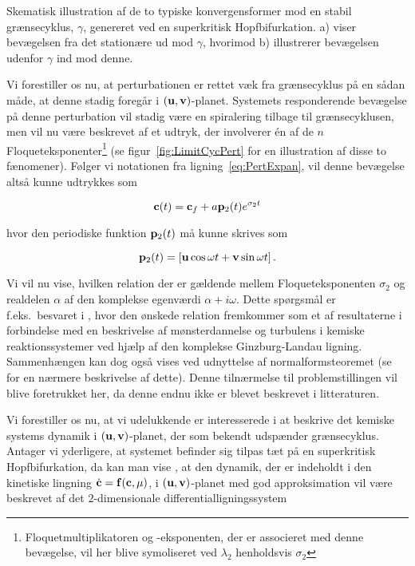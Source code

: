 {
\caption{\protect\capsize 
Skematisk illustration af de to typiske konvergensformer
mod en stabil gr{\ae}nsecyklus, $\gamma$, genereret ved en
superkritisk Hopfbifurkation. a) viser bev{\ae}gelsen fra
det station{\ae}re ud mod $\gamma$, hvorimod b) illustrerer
bev{\ae}gelsen udenfor $\gamma$ ind mod denne.}
\label{fig:LimitCycPert}
}

Vi forestiller os nu, at perturbationen er rettet v{\ae}k
fra gr{\ae}nsecyklus p{\aa} en s{\aa}dan m{\aa}de, at denne
stadig foreg{\aa}r i $({\bf u},{\bf v})$-planet. Systemets
responderende bev{\ae}gelse p{\aa} denne perturbation vil
stadig v{\ae}re en spiralering tilbage til
gr{\ae}nsecyklusen, men vil nu v{\ae}re beskrevet af et
udtryk, der involverer \'{e}n af de $n$
Floquet\-eksponenter\footnote{Floquetmultiplikatoren og
-eksponenten, der er associeret med denne bev{\ae}gelse,
vil her blive symoliseret ved $\lambda_2$ henholdsvis
$\sigma_2$} (se figur~\ref{fig:LimitCycPert} for en
illustration af disse to f{\ae}nomener). F{\o}lger vi
notationen fra lig\-ning~\ref{eq:PertExpan}, vil denne
bev{\ae}gelse alts{\aa} kunne udtrykkes som

\begin{equation} 
 {\bf c} (t) = {\bf c}_f + a {\bf p}_2(t) e^{\sigma_2 t} 
\end{equation} 

hvor den periodiske funktion ${\bf p}_2(t)$ m{\aa} kunne
skrives som 

\begin{equation}
 {\bf p}_2(t) = \left[ {\bf u}\cos \omega t + 
 {\bf v}\sin \omega t \right].
\end{equation}

Vi vil nu vise, hvilken relation der er g{\ae}ldende mellem
Floqueteksponenten $\sigma_2$ og realdelen $\alpha$ af den
komplekse egenv{\ae}rdi $\alpha + i \omega$. Dette
sp{\o}rgsm{\aa}l er f.eks.\ besvaret i
\cite{GinzburgLandau}, hvor den {\o}nskede relation
fremkommer som et af resultaterne i forbindelse med en
beskrivelse af m{\o}nsterdannelse og turbulens i kemiske
reaktions\-sy\-stemer ved hj{\ae}lp af den komplekse
Ginzburg-Landau lig\-ning. Sammenh{\ae}ngen kan dog
ogs{\aa} vises ved udnyttelse af normalformsteoremet (se
\cite{GuckenheimerHolmes} for en n{\ae}rmere beskrivelse af
dette). Denne tiln{\ae}rmelse til problem\-stil\-lingen vil
blive foretrukket her, da denne endnu ikke er blevet
beskrevet i litteraturen.

\vspace{4.0mm}
Vi forestiller os nu, at vi udelukkende er interesserede i
at beskrive det kemiske sy\-stems dynamik i $({\bf u},{\bf
v})$-planet, der som bekendt udsp{\ae}nder
gr{\ae}nsecyklus. Antager vi yderligere, at sy\-stemet
befinder sig tilpas t{\ae}t p{\aa} en superkritisk
Hopfbifurkation, da kan man vise \cite{GuckenheimerHolmes},
at den dynamik, der er indeholdt i den kinetiske lingning
$\dot{\bf c} = {\bf f}({\bf c},\mu)$, i $({\bf u},{\bf
v})$-planet med god approksimation vil v{\ae}re beskrevet
af det $2$-dimensionale differentiallig\-ningssy\-stem

